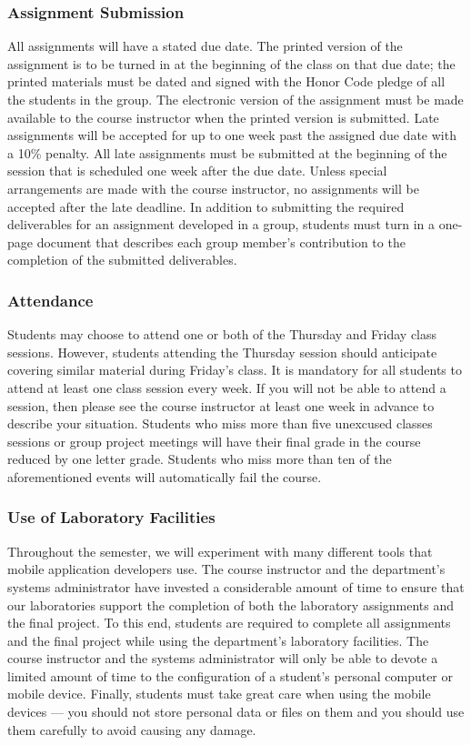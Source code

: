 \subsubsection*{Assignment Submission}

All assignments will have a stated due date. The printed version of the assignment is to be turned in at the beginning
of the class on that due date; the printed materials must be dated and signed with the Honor Code pledge of all the
students in the group.  The electronic version of the assignment must be made available to the course instructor when
the printed version is submitted. Late assignments will be accepted for up to one week past the assigned due date with a
10\% penalty. All late assignments must be submitted at the beginning of the session that is scheduled one week after
the due date. Unless special arrangements are made with the course instructor, no assignments will be accepted after the
late deadline. In addition to submitting the required deliverables for an assignment developed in a group, students must
turn in a one-page document that describes each group member's contribution to the completion of the submitted deliverables.  

\subsubsection*{Attendance}

Students may choose to attend one or both of the Thursday and Friday class sessions.  However, students attending the
Thursday session should anticipate covering similar material during Friday's class.  It is mandatory for all students to
attend at least one class session every week. If you will not be able to attend a session, then please see the course
instructor at least one week in advance to describe your situation.  Students who miss more than five unexcused classes
sessions or group project meetings will have their final grade in the course reduced by one letter grade.  Students who
miss more than ten of the aforementioned events will automatically fail the course.

\subsubsection*{Use of Laboratory Facilities}

Throughout the semester, we will experiment with many different tools that mobile application developers use.  The
course instructor and the department's systems administrator have invested a considerable amount of time to ensure that
our laboratories support the completion of both the laboratory assignments and the final project.  To this end, students
are required to complete all assignments and the final project while using the department's laboratory facilities. The
course instructor and the systems administrator will only be able to devote a limited amount of time to the
configuration of a student's personal computer or mobile device. Finally, students must take great care when using the
mobile devices --- you should not store personal data or files on them and you should use them carefully to avoid
causing any damage.

